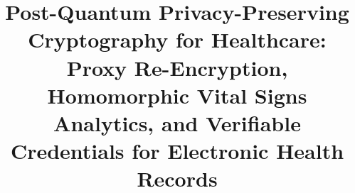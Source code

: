 \documentclass[conference,10pt]{IEEEtran}
\begin{document}
\title{Post-Quantum Privacy-Preserving Cryptography for Healthcare: Proxy Re-Encryption, Homomorphic Vital Signs Analytics, and Verifiable Credentials for Electronic Health Records}

\author{
}

\maketitle

\end{document}
